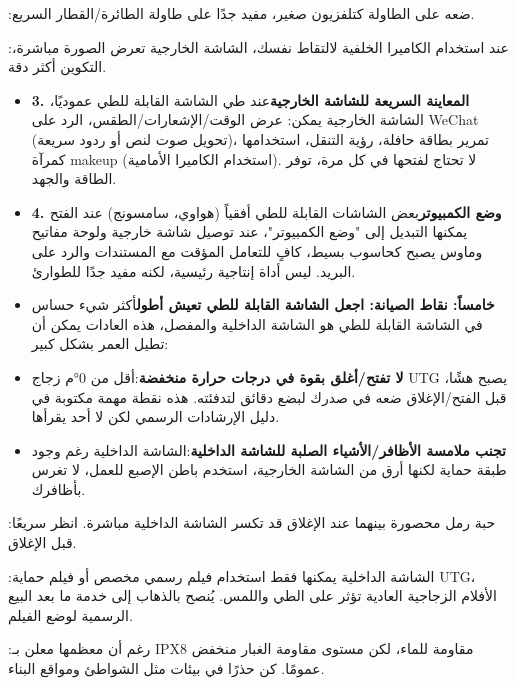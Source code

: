 
:ضعه على الطاولة كتلفزيون صغير، مفيد جدًا على طاولة الطائرة/القطار السريع.


:عند استخدام الكاميرا الخلفية لالتقاط نفسك، الشاشة الخارجية تعرض الصورة مباشرة، التكوين أكثر دقة.

\begin{itemize}
  \item \textbf{3. المعاينة السريعة للشاشة الخارجية}عند طي الشاشة القابلة للطي عموديًا، الشاشة الخارجية يمكن: عرض الوقت/الإشعارات/الطقس، الرد على WeChat (تحويل صوت لنص أو ردود سريعة)، تمرير بطاقة حافلة، رؤية التنقل، استخدامها كمرآة makeup (استخدام الكاميرا الأمامية). لا تحتاج لفتحها في كل مرة، توفر الطاقة والجهد.
  \item \textbf{4. وضع الكمبيوتر}بعض الشاشات القابلة للطي أفقياً (هواوي، سامسونج) عند الفتح يمكنها التبديل إلى "وضع الكمبيوتر"، عند توصيل شاشة خارجية ولوحة مفاتيح وماوس يصبح كحاسوب بسيط، كافٍ للتعامل المؤقت مع المستندات والرد على البريد. ليس أداة إنتاجية رئيسية، لكنه مفيد جدًا للطوارئ.
  \item \textbf{خامساً: نقاط الصيانة: اجعل الشاشة القابلة للطي تعيش أطول}أكثر شيء حساس في الشاشة القابلة للطي هو الشاشة الداخلية والمفصل، هذه العادات يمكن أن تطيل العمر بشكل كبير:
  \item \textbf{لا تفتح/أغلق بقوة في درجات حرارة منخفضة}:أقل من 0°م زجاج UTG يصبح هشًا، قبل الفتح/الإغلاق ضعه في صدرك لبضع دقائق لتدفئته. هذه نقطة مهمة مكتوبة في دليل الإرشادات الرسمي لكن لا أحد يقرأها.
  \item \textbf{تجنب ملامسة الأظافر/الأشياء الصلبة للشاشة الداخلية}:الشاشة الداخلية رغم وجود طبقة حماية لكنها أرق من الشاشة الخارجية، استخدم باطن الإصبع للعمل، لا تغرس بأظافرك.
\end{itemize}


:حبة رمل محصورة بينهما عند الإغلاق قد تكسر الشاشة الداخلية مباشرة. انظر سريعًا قبل الإغلاق.


:الشاشة الداخلية يمكنها فقط استخدام فيلم رسمي مخصص أو فيلم حماية UTG، الأفلام الزجاجية العادية تؤثر على الطي واللمس. يُنصح بالذهاب إلى خدمة ما بعد البيع الرسمية لوضع الفيلم.


:رغم أن معظمها معلن بـ IPX8 مقاومة للماء، لكن مستوى مقاومة الغبار منخفض عمومًا. كن حذرًا في بيئات مثل الشواطئ ومواقع البناء.

